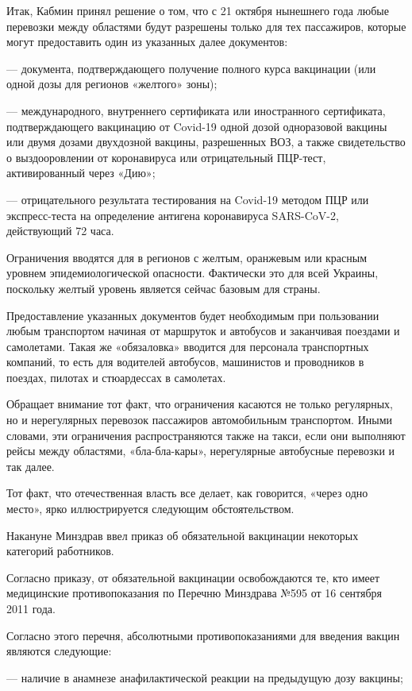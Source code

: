Итак, Кабмин принял решение о том, что с 21 октября нынешнего года любые
перевозки между областями будут разрешены только для тех пассажиров, которые
могут предоставить один из указанных далее документов:

— документа, подтверждающего получение полного курса вакцинации (или одной дозы
для регионов «желтого» зоны);

— международного, внутреннего сертификата или иностранного сертификата,
подтверждающего вакцинацию от Covid-19 одной дозой одноразовой вакцины или
двумя дозами двухдозной вакцины, разрешенных ВОЗ, а также свидетельство о
выздооровлении от коронавируса или отрицательный ПЦР-тест, активированный через
«Дию»;

— отрицательного результата тестирования на Covid-19 методом ПЦР или
экспресс-теста на определение антигена коронавируса SARS-CoV-2, действующий 72
часа.

Ограничения вводятся для в регионов с желтым, оранжевым или красным уровнем
эпидемиологической опасности. Фактически это для всей Украины, поскольку желтый
уровень является сейчас базовым для страны.

Предоставление указанных документов будет необходимым при пользовании любым
транспортом начиная от маршруток и автобусов и заканчивая поездами и
самолетами. Такая же «обязаловка» вводится для персонала транспортных компаний,
то есть для водителей автобусов, машинистов и проводников в поездах, пилотах и
стюардессах в самолетах.

Обращает внимание тот факт, что ограничения касаются не только регулярных, но и
нерегулярных перевозок пассажиров автомобильным транспортом. Иными словами, эти
ограничения распространяются также на такси, если они выполняют рейсы между
областями, «бла-бла-кары», нерегулярные автобусные перевозки и так далее.

Тот факт, что отечественная власть все делает, как говорится, «через одно
место», ярко иллюстрируется следующим обстоятельством.

Накануне Минздрав ввел приказ об обязательной вакцинации некоторых категорий
работников.

Согласно приказу, от обязательной вакцинации освобождаются те, кто имеет
медицинские противопоказания по Перечню Минздрава №595 от 16 сентября 2011
года.

Согласно этого перечня, абсолютными противопоказаниями для введения вакцин
являются следующие:

— наличие в анамнезе анафилактической реакции на предыдущую дозу вакцины;

